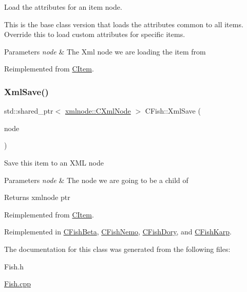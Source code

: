 Load the attributes for an item node.

This is the base class version that loads the attributes common to all items. Override this to load custom attributes for specific items.


\begin{DoxyParams}{Parameters}
{\em node} & The Xml node we are loading the item from \\
\hline
\end{DoxyParams}


Reimplemented from \mbox{\hyperlink{class_c_item_ad0bad7d47a01ff133734b5498f9ca3bb}{C\+Item}}.

\mbox{\label{class_c_fish_abfc997d2d755be8f94069c57e75a854b}} 
\subsubsection{\texorpdfstring{Xml\+Save()}{XmlSave()}}
{\footnotesize\ttfamily std\+::shared\+\_\+ptr$<$ \mbox{\hyperlink{classxmlnode_1_1_c_xml_node}{xmlnode\+::\+C\+Xml\+Node}} $>$ C\+Fish\+::\+Xml\+Save (\begin{DoxyParamCaption}\item[{const std\+::shared\+\_\+ptr$<$ \mbox{\hyperlink{classxmlnode_1_1_c_xml_node}{xmlnode\+::\+C\+Xml\+Node}} $>$ \&}]{node }\end{DoxyParamCaption})\hspace{0.3cm}{\ttfamily [virtual]}}

Save this item to an X\+ML node 
\begin{DoxyParams}{Parameters}
{\em node} & The node we are going to be a child of \\
\hline
\end{DoxyParams}
\begin{DoxyReturn}{Returns}
xmlnode ptr 
\end{DoxyReturn}


Reimplemented from \mbox{\hyperlink{class_c_item_a10584fa8e05d3abe125f95f0ceecdedd}{C\+Item}}.



Reimplemented in \mbox{\hyperlink{class_c_fish_beta_a0be2886a531ede77bfa5338fec71d71b}{C\+Fish\+Beta}}, \mbox{\hyperlink{class_c_fish_nemo_ae9fd9446cd4852c9d9a78831bec0f32f}{C\+Fish\+Nemo}}, \mbox{\hyperlink{class_c_fish_dory_ac906b7f952cdbc52a72d1e87c9228ad9}{C\+Fish\+Dory}}, and \mbox{\hyperlink{class_c_fish_karp_a182d8cce606be73a981bd140aca64ba8}{C\+Fish\+Karp}}.



The documentation for this class was generated from the following files\+:\begin{DoxyCompactItemize}
\item 
Fish.\+h\item 
\mbox{\hyperlink{_fish_8cpp}{Fish.\+cpp}}\end{DoxyCompactItemize}
